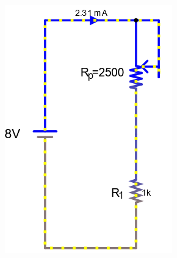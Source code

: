 \documentclass[a4paper]{article}
\begin{document}
\begin{figure}[H]
\begin{subfigure}{0.333\textwidth}
        \includegraphics[width=.9\linewidth]{amp8}
    \end{subfigure}
    \begin{subfigure}{0.333\textwidth}

\end{subfigure}
\end{figure}
\end{document}
